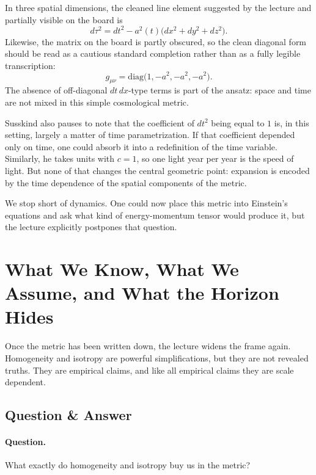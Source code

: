In three spatial dimensions, the cleaned line element suggested by the lecture and partially visible on the board is
\begin{equation}
d\tau^2 = dt^2 - a^2(t)\bigl(dx^2+dy^2+dz^2\bigr).
\end{equation}
Likewise, the matrix on the board is partly obscured, so the clean diagonal form should be read as a cautious standard completion rather than as a fully legible transcription:
\begin{equation}
g_{\mu\nu}=\mathrm{diag}\bigl(1,-a^2,-a^2,-a^2\bigr).
\end{equation}
The absence of off-diagonal \(dt\,dx\)-type terms is part of the ansatz: space and time are not mixed in this simple cosmological metric.

Susskind also pauses to note that the coefficient of \(dt^2\) being equal to \(1\) is, in this setting, largely a matter of time parametrization. If that coefficient depended only on time, one could absorb it into a redefinition of the time variable. Similarly, he takes units with \(c=1\), so one light year per year is the speed of light. But none of that changes the central geometric point: expansion is encoded by the time dependence of the spatial components of the metric.

We stop short of dynamics. One could now place this metric into Einstein's equations and ask what kind of energy-momentum tensor would produce it, but the lecture explicitly postpones that question.

\section{What We Know, What We Assume, and What the Horizon Hides}

Once the metric has been written down, the lecture widens the frame again. Homogeneity and isotropy are powerful simplifications, but they are not revealed truths. They are empirical claims, and like all empirical claims they are scale dependent.

\subsection{Question \& Answer}

\paragraph{Question.} What exactly do homogeneity and isotropy buy us in the metric?

